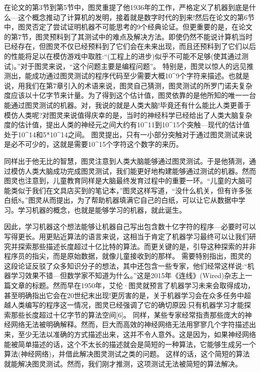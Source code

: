 在论文的第3节到第5节中，图灵重提了他1936年的工作，严格定义了机器到底是什么---这个概念推动了计算机的发明，接着就是数字时代的到来!然后在论文的第6节中，图灵否定了尝试证明机器不可能思考的9个经典论证。但更重要的是，在论文的第7节，图灵预料到了其测试中的难点及解决方法。即使仍然不能说计算机当时已经存在，但图灵不仅已经预料到了它们会在未来出现，而且还预料到了它们以后的性能将足以在模仿游戏中取胜:“(工程上的进步)似乎不可能不足够(使其通过测试)。”对于图灵来说，“这个问题主要是编程问题”。
特别是，图灵以惊人的远见推测出，能成功通过图灵测试的程序代码至少需要大概10^9个字符来描述。也就是说，用我们在第7章引入的术语来说，图灵自己猜测，图灵测试的所罗门诺夫复杂度应该以十亿字节来计量。为了得到这个估计值，图灵依靠的是他所知的唯一一台能通过图灵测试的机器。对，我说的就是人类大脑!毕竟还有什么能比人类更善于模仿人类呢?对图灵来说值得庆幸的是，当时的神经科学已经给出了人类大脑复杂度的估计值，提出人类的神经元之间大约有10^11到10^15个突触---现代的估计值处于10^14和5*10^14之间。
图灵提出，只有一小部分突触对于通过图灵测试来说是必不可少的，这就是需要10^15个字符这个数字的来历。

同样出于他无比的智慧，图灵注意到人类大脑能够通过图灵测试。于是他猜测，通过模仿人类大脑成功完成图灵测试，我们能更好地构建能够通过测试的机器。然而图灵也注意到，儿童教育同样是大脑最终发育过程中的重要一环。“儿童的大脑可能类似于我们在文具店买到的笔记本，”图灵这样写道，“没什么机关，但有许多张白纸8。”图灵从而提出，为了帮助机器填满它自己的白纸，可以让它从数据中学习。学习机器的概念，也就是能够学习的机器，就此诞生。

因此，学习机器这个想法能够让机器自己写出包含数十亿字符的程序---必要时可以写得更长。用更贴近算法的语言来说，这相当于肯定了机器学习最终可以让我们研究并探索那些描述长度超过十亿比特的算法。而更关键的是，引导这种探索的并非程序员的指尖，而是原始数据，就像儿童接收到的那样。
需要特别指出，图灵的这段论证反驳了众多知识分子的想法，其中还包含一些专家，他们经常这样说:“机器学习效果不错---但数学家不知道为什么。”这是2015年《连线》(Wired)杂志上一篇文章的标题。然而早在1950年，艾伦·图灵就预言了机器学习未来会取得成功，甚至明确指出它会在20世纪末出现!更厉害的是，关于机器学习会在众多任务中超越人类编写的程序这一情况，图灵已经强调了它的确切原因:只有机器学习才能探索那些长度超过十亿字节的算法空间[6]。
同样，某些专家经常指责那些庞大的神经网络无法被明确解释。然而，巨大而高效的神经网络无法用寥寥几个字符描述出来，至少无法以准确的方式描述出来，这并不令人意外。这是因为，如果神经网络能被简单描述的话，这个不太长的描述就会是简短的一种算法，它能够生成另一个算法(神经网络)，并借此解决图灵测试之类的问题。
这样的话，这个简短的算法就能解决图灵测试。然而，我们刚才推测，这项测试无法被简短的算法解决。

